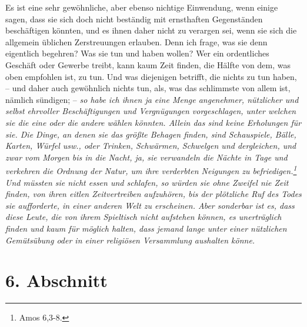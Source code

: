 \medskip

Es ist eine sehr gewöhnliche, aber ebenso nichtige Einwendung, wenn einige
sagen, dass sie sich doch nicht beständig mit ernsthaften Gegenständen
beschäftigen könnten, und es ihnen daher nicht zu verargen sei, wenn sie sich
die allgemein üblichen Zerstreuungen erlauben. Denn ich frage, was sie denn
eigentlich begehren? Was sie tun und haben wollen? Wer ein ordentliches
Geschäft oder Gewerbe treibt, kann kaum Zeit finden, die Hälfte von dem, was
oben empfohlen ist, zu tun. Und was diejenigen betrifft, die nichts zu tun
haben, -- und daher auch gewöhnlich nichts tun, als, was das schlimmste von
allem ist, nämlich sündigen; -- \textit{so habe ich ihnen ja eine Menge
angenehmer,
nützlicher und selbst ehrvoller Beschäftigungen und Vergnügungen
vorgeschlagen, unter welchen sie die eine oder die andere wählen könnten. Allein
das
sind keine Erholungen für sie. Die Dinge, an denen sie das größte Behagen
finden, sind Schauspiele, Bälle, Karten, Würfel usw., oder Trinken,
Schwärmen, Schwelgen und dergleichen, und zwar vom Morgen bis
in die Nacht, ja,
sie verwandeln die Nächte in Tage und verkehren die Ordnung der Natur, um ihre
verderbten Neigungen zu befriedigen.\footnote{Amos 6,3-8.}
Und müssten sie nicht
essen und schlafen, so würden sie ohne Zweifel nie Zeit finden, von ihren eitlen
Zeitvertreiben aufzuhören, bis der plötzliche Ruf des Todes sie aufforderte, in
einer anderen Welt zu erscheinen. Aber sonderbar ist es, dass diese Leute, die
von
ihrem Spieltisch nicht aufstehen können, es unerträglich finden und kaum für
möglich halten, dass jemand lange unter einer nützlichen Gemütsübung oder in
einer religiösen Versammlung aushalten könne.}

\section{6. Abschnitt} \label{kap15_ab6}

